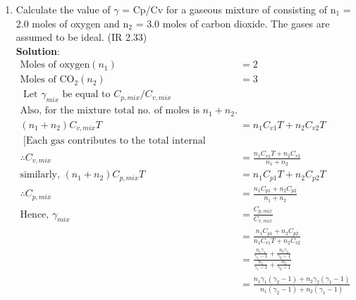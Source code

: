 \begin{enumerate}
\item Calculate the value of $\gamma$ = Cp/Cv for a gaseous mixture of consisting of n$_1$ = 2.0 moles of oxygen and n$_2$ = 3.0 moles of carbon dioxide. The gases are assumed to be ideal. (IR 2.33)\\
\textbf{Solution}:
\begin{align*}
    \text{Moles of oxygen} (n_1) &= 2 \\
    \text{Moles of CO}{_2} (n_2) &= 3 \\
    \text{    Let }  \gamma_{mix}  \text{ be equal to }  C_{p,mix}/C_{v,mix} \\
    \text{Also, for the mixture total no. of moles is }n_1 + n_2.\\
    (n_1 + n_2) C_{v,mix}T &= n_1C_{v1}T + n_2C_{v2}T \\ \text{  [Each gas contributes to the total internal energy]}\\
    \therefore C_{v, mix} &= \frac{n_1C_{v1}T + n_2C_{v2}}{n_1 + n_2}\\
    \text{similarly, } (n_1 + n_2) C_{p,mix}T &= n_1 C_{p1}T + n_2C_{p2}T \\
    \therefore C_{p, mix} &= \frac{n_1 C_{p1} + n_2C_{p2}}{n_1 + n_2}\\
    \text{Hence, }\gamma_{mix} &= \frac{C_{p,mix}}{C_{v,mix}}\\
    &= \frac{n_1 C_{p1} + n_2C_{p2}}{n_1C_{v1}T + n_2C_{v2}}\\
    &= \frac{\frac{n_1 \gamma_1}{\gamma_1 -1}+ \frac{n_2 \gamma_2}{\gamma_2 - 1}}{\frac{n_1}{\gamma_1 -1} + \frac{n_2}{\gamma_2 - 1}}\\
    &= \frac{n_1\gamma_1(\gamma_2 - 1) + n_2\gamma_2(\gamma_1 - 1)}{n_1(\gamma_2 - 1) + n_2(\gamma_1 - 1)}
\end{align*}


\end{enumerate}
